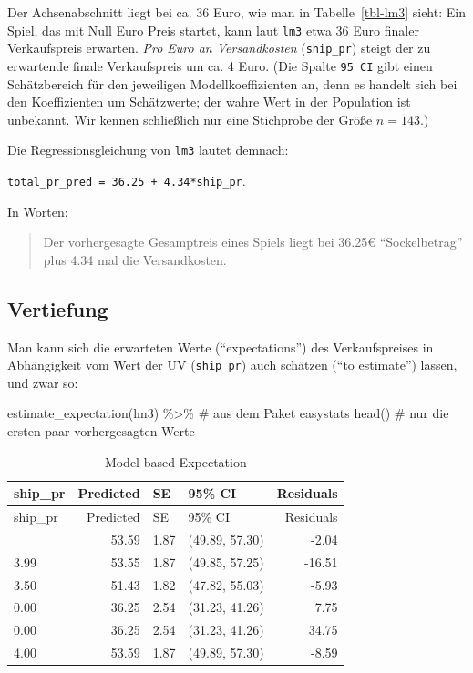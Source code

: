\documentclass[
  a4paper,
]{scrbook}
\newenvironment{Shaded}{\begin{snugshade}}{\end{snugshade}}
\newcommand{\CommentTok}[1]{\textcolor[rgb]{0.37,0.37,0.37}{#1}}
\newcommand{\FunctionTok}[1]{\textcolor[rgb]{0.28,0.35,0.67}{#1}}
\newcommand{\NormalTok}[1]{\textcolor[rgb]{0.00,0.23,0.31}{#1}}
\newcommand{\SpecialCharTok}[1]{\textcolor[rgb]{0.37,0.37,0.37}{#1}}
\theoremstyle{definition}
\theoremstyle{definition}
\theoremstyle{definition}
\theoremstyle{remark}
\begin{document}
Der Achsenabschnitt liegt bei ca. 36 Euro, wie man in
Tabelle~\ref{tbl-lm3} sieht: Ein Spiel, das mit Null Euro Preis startet,
kann laut \texttt{lm3} etwa 36 Euro finaler Verkaufspreis erwarten.
\emph{Pro Euro an Versandkosten} (\texttt{ship\_pr}) steigt der zu
erwartende finale Verkaufspreis um ca. 4 Euro. (Die Spalte
\texttt{95\ CI} gibt einen Schätzbereich für den jeweiligen
Modellkoeffizienten an, denn es handelt sich bei den Koeffizienten um
Schätzwerte; der wahre Wert in der Population ist unbekannt. Wir kennen
schließlich nur eine Stichprobe der Größe \(n=143\).)

Die Regressionsgleichung von \texttt{lm3} lautet demnach:

\texttt{total\_pr\_pred\ =\ 36.25\ +\ 4.34*ship\_pr}.

In Worten:

\begin{quote}
Der vorhergesagte Gesamptreis eines Spiels liegt bei 36.25€
``Sockelbetrag'' plus 4.34 mal die Versandkosten.
\end{quote}

\subsection{Vertiefung}\label{vertiefung-6}

Man kann sich die erwarteten Werte (``expectations'') des
Verkaufspreises in Abhängigkeit vom Wert der UV (\texttt{ship\_pr}) auch
schätzen (``to estimate'') lassen, und zwar so:

\begin{Shaded}
\begin{Highlighting}[]
\FunctionTok{estimate\_expectation}\NormalTok{(lm3) }\SpecialCharTok{\%\textgreater{}\%}  \CommentTok{\# aus dem Paket \textquotesingle{}easystats\textquotesingle{}}
  \FunctionTok{head}\NormalTok{()  }\CommentTok{\# nur die ersten paar vorhergesagten Werte}
\end{Highlighting}
\end{Shaded}

\begin{longtable}[]{@{}lrllr@{}}
\caption{Model-based Expectation}\tabularnewline
\toprule\noalign{}
ship\_pr & Predicted & SE & 95\% CI & Residuals \\
\midrule\noalign{}
\endfirsthead
\toprule\noalign{}
ship\_pr & Predicted & SE & 95\% CI & Residuals \\
\midrule\noalign{}
\endhead
\bottomrule\noalign{}
\endlastfoot
4.00 & 53.59 & 1.87 & (49.89, 57.30) & -2.04 \\
3.99 & 53.55 & 1.87 & (49.85, 57.25) & -16.51 \\
3.50 & 51.43 & 1.82 & (47.82, 55.03) & -5.93 \\
0.00 & 36.25 & 2.54 & (31.23, 41.26) & 7.75 \\
0.00 & 36.25 & 2.54 & (31.23, 41.26) & 34.75 \\
4.00 & 53.59 & 1.87 & (49.89, 57.30) & -8.59 \\
\end{longtable}
\end{document}
